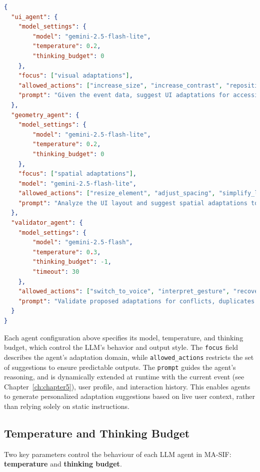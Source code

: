 \documentclass[openany]{book}
\begin{document}
\begin{lstlisting}[language=json,firstnumber=1, caption={Basic example of a 2-agent (+ validator) configuration}]
{
  "ui_agent": {
    "model_settings": {
        "model": "gemini-2.5-flash-lite",
        "temperature": 0.2,
        "thinking_budget": 0
    },
    "focus": ["visual adaptations"],
    "allowed_actions": ["increase_size", "increase_contrast", "reposition_element"],
    "prompt": "Given the event data, suggest UI adaptations for accessibility. Consider user profile and interaction history."
  },
  "geometry_agent": {
    "model_settings": {
        "model": "gemini-2.5-flash-lite",
        "temperature": 0.2,
        "thinking_budget": 0
    },
    "focus": ["spatial adaptations"],
    "model": "gemini-2.5-flash-lite",
    "allowed_actions": ["resize_element", "adjust_spacing", "simplify_layout"],
    "prompt": "Analyze the UI layout and suggest spatial adaptations to improve usability for motor-impaired users."
  },
  "validator_agent": {
    "model_settings": {
        "model": "gemini-2.5-flash",
        "temperature": 0.3,
        "thinking_budget": -1,
        "timeout": 30
    },
    "allowed_actions": ["switch_to_voice", "interpret_gesture", "recover_from_error", "increase_size", "increase_contrast", "reposition_element","resize_element", "adjust_spacing", "simplify_layout"],
    "prompt": "Validate proposed adaptations for conflicts, duplicates and inconsistencies based on user context, events and interaction history."
  }
}
\end{lstlisting}
Each agent configuration above specifies its model, temperature, and thinking budget, which control the LLM's behavior and output style. The \texttt{focus} field describes the agent's adaptation domain, while \texttt{allowed\_actions} restricts the set of suggestions to ensure predictable outputs. The \texttt{prompt} guides the agent's reasoning, and is dynamically extended at runtime with the current event (see Chapter~\ref{ch:chapter5}), user profile, and interaction history. This enables agents to generate personalized adaptation suggestions based on live user context, rather than relying solely on static instructions.

\subsection{Temperature and Thinking Budget}

Two key parameters control the behaviour of each LLM agent in MA-SIF: \textbf{temperature} and \textbf{thinking budget}.
\end{document}
